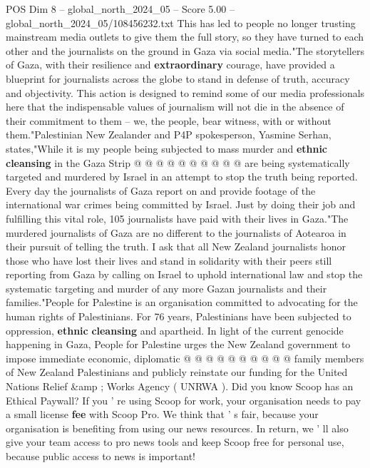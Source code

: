 \begin{textsample}{POS Dim 8 – global\_north\_2024\_05 – Score 5.00 – global\_north\_2024\_05/108456232.txt}
This has led to people no longer trusting mainstream media outlets to give them the full story, so they have turned to each other and the journalists on the ground in Gaza via social media."The storytellers of Gaza, with their resilience and \textbf{extraordinary} courage, have provided a blueprint for journalists across the globe to stand in defense of truth, accuracy and objectivity.
This action is designed to remind some of our media professionals here that the indispensable values of journalism will not die in the absence of their commitment to them -- we, the people, bear witness, with or without them."Palestinian New Zealander and P4P spokesperson, Yasmine Serhan, states,"While it is my people being subjected to mass murder and \textbf{ethnic} \textbf{cleansing} in the Gaza Strip @ @ @ @ @ @ @ @ @ @ are being systematically targeted and murdered by Israel in an attempt to stop the truth being reported.
Every day the journalists of Gaza report on and provide footage of the international war crimes being committed by Israel.
Just by doing their job and fulfilling this vital role, 105 journalists have paid with their lives in Gaza."The murdered journalists of Gaza are no different to the journalists of Aotearoa in their pursuit of telling the truth.
I ask that all New Zealand journalists honor those who have lost their lives and stand in solidarity with their peers still reporting from Gaza by calling on Israel to uphold international law and stop the systematic targeting and murder of any more Gazan journalists and their families."People for Palestine is an organisation committed to advocating for the human rights of Palestinians.
For 76 years, Palestinians have been subjected to oppression, \textbf{ethnic} \textbf{cleansing} and apartheid.
In light of the current genocide happening in Gaza, People for Palestine urges the New Zealand government to impose immediate economic, diplomatic @ @ @ @ @ @ @ @ @ @ family members of New Zealand Palestinians and publicly reinstate our funding for the United Nations Relief \&amp ; Works Agency ( UNRWA ).
Did you know Scoop has an Ethical Paywall?
If you ' re using Scoop for work, your organisation needs to pay a small license \textbf{fee} with Scoop Pro.
We think that ' s fair, because your organisation is benefiting from using our news resources.
In return, we ' ll also give your team access to pro news tools and keep Scoop free for personal use, because public access to news is important!

\end{textsample}
